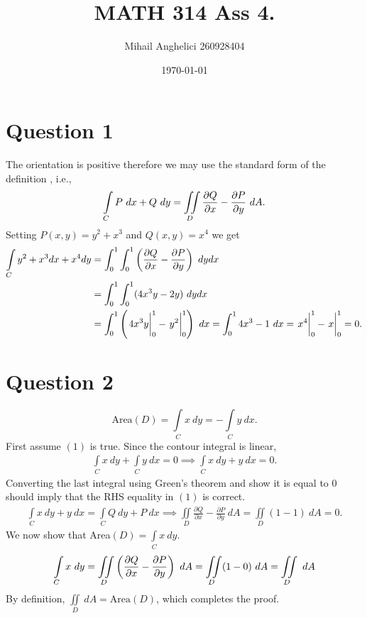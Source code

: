 \documentclass[
	12pt,
	]{article}
\title{MATH 314 Ass 4.}
\author{Mihail Anghelici 260928404 }
\date{\today}
\theoremstyle{definition}
\theoremstyle{definition}
\theoremstyle{definition}
\theoremstyle{definition}
\theoremstyle{definition}
\theoremstyle{example}
\theoremstyle{note}
\theoremstyle{remark}
\theoremstyle{example}
\begin{document}
	\maketitle
		\section*{Question 1}
			The orientation is positive therefore we may use the standard form of the definition , i.e.,
			\begin{equation*}
				\int\limits_{C} P \ dx + Q \ dy = \iint\limits_{D} \pdv{Q}{x} - \pdv{P}{y} \ dA .
			\end{equation*}
			Setting $P(x,y) = y^{2} + x^{3}$ and $Q(x,y) = x^{4}$ we get
			\begin{align*}
				\int\limits_{C} y^{2} + x^{3}dx + x^{4} dy &= \int_{0}^{1} \int_{0}^{1} \left(\pdv{Q}{x} - \pdv{P}{y}\right) \ dydx \\
				&= \int_{0}^{1} \int_{0}^{1} (4x^{3}y - 2y) \ dy dx\\
				&= \int_{0}^{1} \left(\eval{4x^{3}y}_{0}^{1} - \eval{y^{2}}_{0}^{1}\right) \ dx 
				= \int_{0}^{1} 4x^{3} - 1 \ dx = \eval{x^{4}}_{0}^{1} - \eval{x}_{0}^{1} = 0.
			\end{align*}
		\section*{Question 2}
			\begin{equation} 
			\text{Area}(D) = \int\limits_{C}x \ dy = - \int\limits_{C} y \ dx.
			\end{equation}
			First assume $(1)$ is true. Since the contour integral is linear,
			\begin{gather*}
			\int\limits_{C} x \ dy + \int\limits_{C} y \ dx = 0 \implies \int\limits_{C} x\ dy + y \ dx =0.
			\end{gather*}
			Converting the last integral using Green's theorem and show it is equal to $0$ should imply that the RHS equality in $(1)$ is correct.
			\begin{gather*}
			\int\limits_{C} x \ dy +y \ dx = \int\limits_{C} Q \ dy + P \ dx \implies \iint\limits_{D} \frac{\partial Q}{\partial x} - \frac{\partial P}{\partial y} \ dA = \iint\limits_{D}(1-1)\ dA = 0.
			\end{gather*}
			We now show that Area$(D) = \int\limits_{C} x \ dy$.
			\begin{equation*}
				\int\limits_{C} x \ dy = \iint\limits_{D} \left(\pdv{Q}{x} - \pdv{P}{y}\right) \ dA = \iint\limits_{D} (1-0) \ dA = \iint\limits_{D} \ dA
 			\end{equation*}
 			By definition, $\iint\limits_{D} \ dA = \text{Area}(D)$, which completes the proof.
 			
\end{document}
